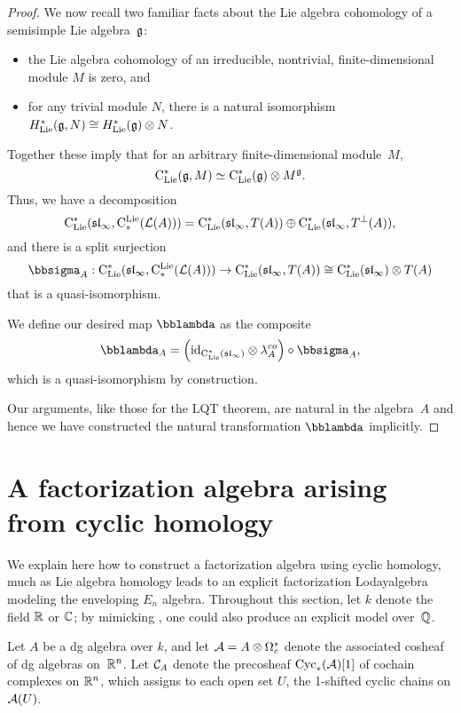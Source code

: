 \documentclass[11pt]{amsart}
\numberwithin{equation}{section}
\begin{document}
\begin{proof}
We now recall two familiar facts about the Lie algebra cohomology of a semisimple Lie algebra~$\mathfrak g$:
\begin{itemize}
\item the Lie algebra cohomology of an irreducible, nontrivial, finite-dimensional module $M$ is zero, and
\item for any trivial module $N$, there is a natural isomorphism $H^*_{\rm Lie}( \mathfrak g,N) \cong H^*_{\rm Lie}(\mathfrak g) \otimes N$.
\end{itemize}
Together these imply that for an arbitrary finite-dimensional module~$M$,
\[
{\rm C}_{\rm Lie}^*(\mathfrak g,M) \simeq {\rm C}_{\rm Lie}^*(\mathfrak g) \otimes M^\mathfrak g.
\]
Thus, we have a decomposition
\[
{\rm C}_{\rm Lie}^*(\frak{sl}_\infty,{\rm C}^{\rm Lie}_*(\mathcal L(A))) = {\rm C}_{\rm Lie}^*(\frak{sl}_\infty,T(A)) \oplus {\rm C}_{\rm Lie}^*(\frak{sl}_\infty,T^\perp(A)), 
\]
and there is a split surjection
\[
\bbsigma_A: \clies(\sl_\infty,\cliels(\cL(A))) \to \clies(\sl_\infty,T(A)) \cong \clies(\sl_\infty) \otimes T(A) 
\]
that is a quasi-isomorphism.

We define our desired map $\lqt$ as the composite
\[
\lqt_A = \left(\id_{\clies(\sl_\infty)} \otimes \lambda^{co}_A \right) \circ \bbsigma_A,
\]
which is a quasi-isomorphism by construction.

Our arguments, like those for the LQT theorem, are natural in the algebra~$A$ and hence we have constructed the natural transformation $\lqt$ implicitly.
\end{proof}

\section{A factorization algebra arising from cyclic homology}

We explain here how to construct a factorization algebra using cyclic homology,
much as Lie algebra homology leads to an explicit factorization Lodayalgebra modeling the enveloping $E_n$ algebra. 
Throughout this section, let $k$ denote the field $\mathbb R$ or $\mathbb C$; 
by mimicking \cite{Knudsen}, one could also produce an explicit model over~$\mathbb Q$.

\begin{dfn}
Let $A$ be a dg algebra over $k$, and let $\mathcal A = A \otimes \Omega^*_c$ denote the associated cosheaf of dg algebras on~$\mathbb R^n$.
Let $\mathcal C_A$ denote the precosheaf ${\rm Cyc}_*(\mathcal A)[1]$ of cochain complexes on $\mathbb R^n$,
which assigns to each open set $U$, the 1-shifted cyclic chains on $\mathcal A(U)$.
\end{dfn}
\end{document}
